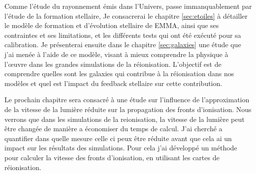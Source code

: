 Comme l'étude du rayonnement émis dans l'Univers, passe immanquablement par l'étude de la formation stellaire,
Je consacrerai le chapitre \ref{sec:etoiles} à détailler le modèle de formation et d'évolution stellaire de EMMA, ainsi que ses contraintes et ses limitations, et les différents tests qui ont été exécuté pour sa calibration.
Je présenterai ensuite dans le chapitre \ref{sec:galaxies} une étude que j'ai menée à l'aide de ce modèle, visant à mieux comprendre la physique à l'œuvre dans les grandes simulations de la réionisation.
L'objectif est de comprendre quelles sont les galaxies qui contribue à la réionisation dans nos modèles et quel est l'impact du feedback stellaire sur cette contribution.






Le prochain chapitre sera consacré à une étude sur l'influence de l'approximation de la vitesse de la lumière réduite sur la propagation des fronts d'ionisation.
Nous verrons que dans les simulations de la reionisation, la vitesse de la lumière peut être changée de manière a économiser du temps de calcul.
J'ai cherché a quantifier dans quelle mesure celle ci peux être réduite avant que cela ai un impact sur les résultats des simulations.
Pour cela j'ai développé un méthode pour calculer la vitesse des fronts d'ionisation, en utilisant les cartes de réionisation.

